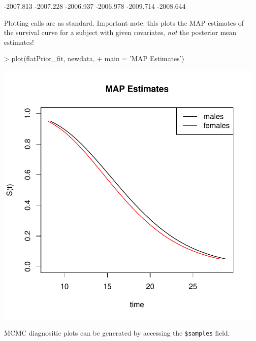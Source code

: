 \documentclass[a4paper]{article}
\begin{document}
\begin{Schunk}
\begin{Soutput}
[1] -2007.813 -2007.228 -2006.937 -2006.978 -2009.714 -2008.644
\end{Soutput}
\end{Schunk}


Plotting calls are as standard. Important note: this plots the MAP estimates of the survival curve for a subject with given covariates, \emph{not} the posterior mean estimates!

\begin{Schunk}
\begin{Sinput}
>   plot(flatPrior_fit, newdata,
+        main = 'MAP Estimates')
\end{Sinput}
\end{Schunk}
\includegraphics{icenReg-017}

MCMC diagnositic plots can be generated by accessing the \texttt{\$samples} field. 
\end{document}

